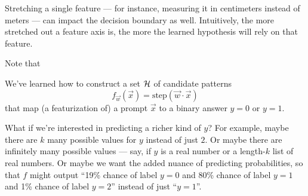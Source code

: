         Stretching a single feature --- for instance, measuring it in
        centimeters instead of meters --- can impact the decision boundary
        as well.  Intuitively, the more stretched out a feature axis is,
        the more the learned hypothesis will rely on that feature.

        Note that




        We've learned how to construct a set $\mathcal{H}$ of candidate patterns
        $$
          f_{\vec w}(\vec x) = \text{step}(\vec w\cdot \vec x)
        $$
        that map (a featurization of) a prompt $\vec x$ to a binary answer
        $y=0$ or $y=1$.

        What if we're interested in predicting a richer kind of $y$?  For
        example, maybe there are $k$ many possible values for $y$ instead of
        just $2$.  Or maybe there are infinitely many possible values --- say,
        if $y$ is a real number or a length-$k$ list of real numbers.  Or maybe
        we want the added nuance of predicting probabilities, so that $f$ might
        output ``19\% chance of label $y=0$ and 80\% chance of label $y=1$ and
        1\% chance of label $y=2$''
        instead of just ``$y=1$''.

